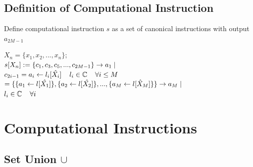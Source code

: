 \documentclass[11pt]{article}
\begin{document}
\subsection{Definition of Computational Instruction}
Define computational instruction $s$ as a set of canonical instructions with output $a_{2M-1}$
\begin{center}
\vspace{1mm}
$
X_n = \{x_1,x_2,...,x_n\};
$
\\ \vspace{6mm}
$
s[X_n] := \{c_1,c_3,c_5,...,c_{2M-1}\} \rightarrow a_{1} \hspace{1mm} |
$
\\ \vspace{3mm}
$
c_{2i -1}= a_i \leftarrow l_i[\hat{X_i}]  \hspace{4mm} l_i \in \mathbb{C} \hspace{4mm} \forall i \leq M
$
\\ \vspace{6mm}
$
= \{\{a_1 \leftarrow l[\hat{X_1}]\},\{a_2 \leftarrow l[\hat{X_2}]\},...,\{a_M \leftarrow l[\hat{X}_M]\}\}  \rightarrow a_M \hspace{1mm} |
$
\\ \vspace{2mm}
$
 l_i \in \mathbb{C} \hspace{4mm} \forall i
$
\end{center}






\newpage
\section{Computational Instructions}






\subsection{Set Union $\cup$}
\end{document}
